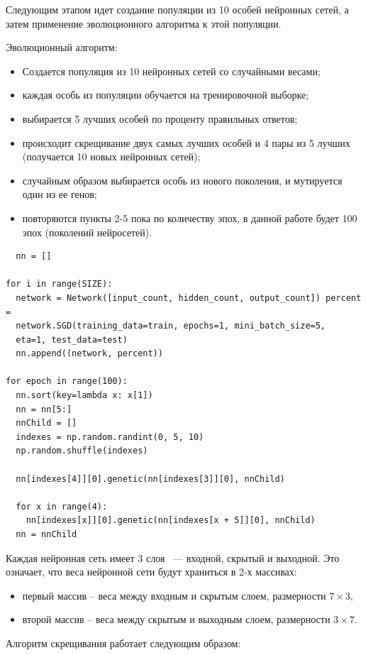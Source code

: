 Следующим этапом идет создание популяции из 10 особей нейронных сетей, а затем применение эволюционного алгоритма к этой популяции.

Эволюционный алгоритм:
\begin{itemize}
  \item Создается популяция из 10 нейронных сетей со случайными весами;
  \item каждая особь из популяции обучается на тренировочной выборке;
  \item выбирается 5 лучших особей по проценту правильных ответов;
  \item происходит скрещивание двух самых лучших особей и 4 пары из 5 лучших (получается 10 новых нейронных сетей);
  \item случайным образом выбирается особь из нового поколения, и мутируется один из ее генов;
  \item повторяются пункты 2-5 пока по количеству эпох, в данной работе будет 100 эпох (поколений нейросетей).
\end{itemize}

\begin{lstlisting}
  nn = []

for i in range(SIZE):
  network = Network([input_count, hidden_count, output_count]) percent =
  network.SGD(training_data=train, epochs=1, mini_batch_size=5,
  eta=1, test_data=test)
  nn.append((network, percent))

for epoch in range(100):
  nn.sort(key=lambda x: x[1])
  nn = nn[5:] 
  nnChild = []
  indexes = np.random.randint(0, 5, 10)
  np.random.shuffle(indexes) 
 
  nn[indexes[4]][0].genetic(nn[indexes[3]][0], nnChild) 

  for x in range(4):
    nn[indexes[x]][0].genetic(nn[indexes[x + 5]][0], nnChild)
  nn = nnChild
\end{lstlisting}

Каждая нейронная сеть имеет 3 слоя ~--- входной, скрытый и выходной. Это означает, что веса нейронной сети будут храниться в 2-х массивах:

\begin{itemize}
  \item первый массив – веса между входным и скрытым слоем, размерности $7\times3$,
  \item второй массив – веса между скрытым и выходным слоем, размерности $3\times7$.
\end{itemize}

Алгоритм скрещивания работает следующим образом:

